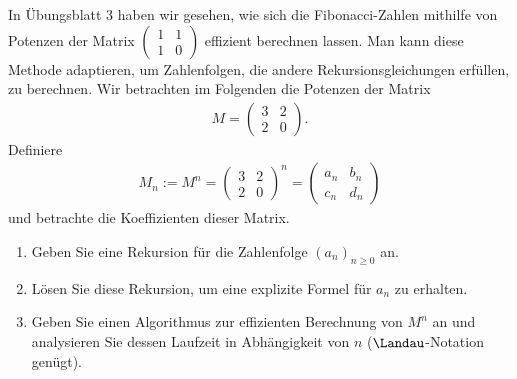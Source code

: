\begin{exercise}
In Übungsblatt 3 haben wir gesehen, wie sich die Fibonacci-Zahlen mithilfe von
Potenzen der Matrix $\begin{pmatrix}1 & 1 \\ 1 & 0\end{pmatrix}$ effizient berechnen
lassen. Man kann diese Methode adaptieren, um Zahlenfolgen, die andere Rekursionsgleichungen
erfüllen, zu berechnen. Wir betrachten im Folgenden die Potenzen der Matrix
\begin{align*}
  M = \begin{pmatrix}
    3 & 2 \\ 2 & 0
  \end{pmatrix}.
\end{align*}
Definiere
\begin{align*}
  M_n := M^n = \begin{pmatrix}3 & 2 \\ 2 & 0\end{pmatrix}^n
  = \begin{pmatrix}a_n & b_n \\ c_n & d_n\end{pmatrix}
\end{align*}
und betrachte die Koeffizienten dieser Matrix.
\begin{enumerate}[label = \alph*)]
  \item Geben Sie eine Rekursion für die Zahlenfolge $(a_n)_{n \geq 0}$ an.
  \item Lösen Sie diese Rekursion, um eine explizite Formel für $a_n$ zu erhalten.
  \item Geben Sie einen Algorithmus zur effizienten Berechnung von $M^n$ an
  und analysieren Sie dessen Laufzeit in Abhängigkeit von $n$ ($\Landau$-Notation genügt).
\end{enumerate}
\end{exercise}


\begin{solution}
\phantom{}
\end{solution}

